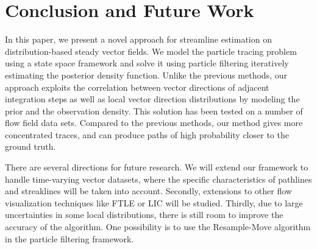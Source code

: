 \section{Conclusion and Future Work}

In this paper, we present a novel approach for streamline estimation on distribution-based steady vector fields. We model the particle tracing problem using a state space framework and solve it using particle filtering iteratively estimating the posterior density function. Unlike the previous methods, our approach exploits the correlation between vector directions of adjacent integration steps as well as local vector direction distributions by modeling the prior and the observation density. This solution has been tested on a number of flow field data sets. Compared to the previous methods, our method gives more concentrated traces, and can produce paths of high probability closer to the ground truth.

There are several directions for future research. We will extend our framework to handle time-varying vector datasets, where the specific characteristics of pathlines and streaklines will be taken into account. Secondly, extensions to other flow visualization techniques like FTLE or LIC will be studied. Thirdly, due to large uncertainties in some local distributions, there is still room to improve the accuracy of the algorithm. One possibility is to use the Resample-Move algorithm in the particle filtering framework.
